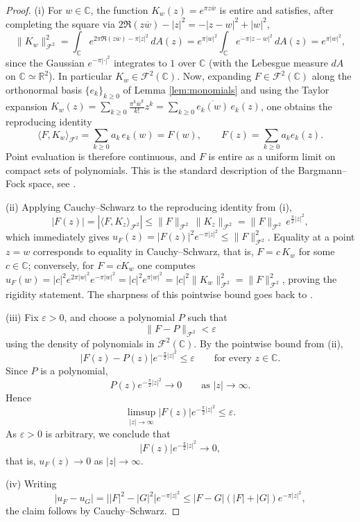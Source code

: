 \documentclass[a4paper,11pt,reqno]{amsart}
\numberwithin{equation}{section}
\theoremstyle{plain} %
\theoremstyle{definition} %
\theoremstyle{remark}
\newcommand{\C}{\mathbb{C}}
\begin{document}
\begin{proof}
(i) For \(w\in \C\), the function \(K_w(z)=e^{\pi z\overline w}\) is entire and
satisfies, after completing the square via
\(2\Re(z\overline w)-|z|^2=-|z-w|^2+|w|^2\),
\[
\|K_w\|_{\mathcal F^2}^2
=
\int_{\C} e^{2\pi \Re(z\overline w)-\pi |z|^2}\,dA(z)
=
e^{\pi |w|^2}\int_{\C}e^{-\pi |z-w|^2}\,dA(z)
=
e^{\pi |w|^2},
\]
since the Gaussian \(e^{-\pi |\cdot|^2}\) integrates to \(1\) over \(\C\) (with
the Lebesgue measure \(dA\) on \(\C\simeq \mathbb R^2\)). In particular
\(K_w\in \mathcal F^2(\C)\). Now, expanding \(F\in \mathcal F^2(\C)\) along the
orthonormal basis \(\{e_k\}_{k\geq 0}\) of Lemma \ref{lem:monomials} and using
the Taylor expansion
\(K_w(z)=\sum_{k\geq 0}\frac{\pi^k\overline w^k}{k!}z^k=\sum_{k\geq 0}\overline{e_k(w)}\,e_k(z)\),
one obtains the reproducing identity
\[
\langle F,K_w\rangle_{\mathcal F^2}
=
\sum_{k\geq 0} a_k\,e_k(w)
=
F(w),
\qquad F(z)=\sum_{k\geq 0}a_k e_k(z).
\]
Point evaluation is therefore continuous, and \(F\) is entire as a uniform
limit on compact sets of polynomials. This is the standard description of the
Bargmann--Fock space, see \cite{Bargmann,Folland,Grochenig,Zhu}.

(ii) Applying Cauchy--Schwarz to the reproducing identity from (i),
\begin{equation}\label{eq:pointwise}
|F(z)|
=
|\langle F,K_z\rangle_{\mathcal F^2}|
\le
\|F\|_{\mathcal F^2}\,\|K_z\|_{\mathcal F^2}
=
\|F\|_{\mathcal F^2}\,e^{\frac{\pi}{2}|z|^2},
\end{equation}
which immediately gives \(u_F(z)=|F(z)|^2 e^{-\pi |z|^2}\le \|F\|_{\mathcal F^2}^2\).
Equality at a point \(z=w\) corresponds to equality in Cauchy--Schwarz, that is,
\(F=c\,K_w\) for some \(c\in \C\); conversely, for \(F=c K_w\) one computes
\(u_F(w)=|c|^2 e^{2\pi |w|^2}e^{-\pi |w|^2}=|c|^2 e^{\pi |w|^2}=|c|^2\|K_w\|_{\mathcal F^2}^2
=\|F\|_{\mathcal F^2}^2\), proving the rigidity statement. The sharpness of this
pointwise bound goes back to \cite{Lieb}.

(iii) Fix \(\varepsilon>0\), and choose a polynomial \(P\) such that
\[
\|F-P\|_{\mathcal F^2}<\varepsilon
\]
using the density of polynomials in \(\mathcal F^2(\C)\). By the pointwise bound from (ii),
\[
|F(z)-P(z)|e^{-\frac{\pi}{2}|z|^2}\le \varepsilon
\qquad\text{for every }z\in \C.
\]
Since \(P\) is a polynomial,
\[
P(z)e^{-\frac{\pi}{2}|z|^2}\to 0
\qquad\text{as }|z|\to\infty.
\]
Hence
\[
\limsup_{|z|\to\infty}|F(z)|e^{-\frac{\pi}{2}|z|^2}\le \varepsilon.
\]
As \(\varepsilon>0\) is arbitrary, we conclude that
\[
|F(z)|e^{-\frac{\pi}{2}|z|^2}\to 0,
\]
that is, \(u_F(z)\to 0\) as \(|z|\to\infty\).

(iv) Writing
\[
|u_F - u_G|
= \big||F|^2 - |G|^2\big| e^{-\pi|z|^2}
\le |F-G|(|F|+|G|) e^{-\pi|z|^2},
\]
the claim follows by Cauchy--Schwarz.
\end{proof}
\end{document}
